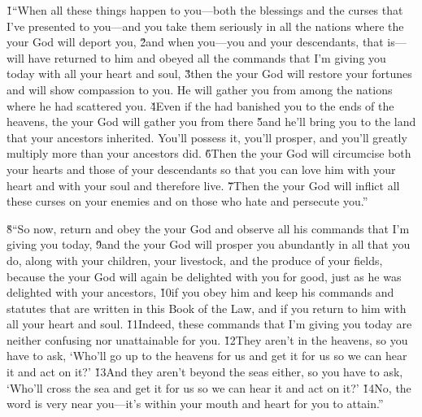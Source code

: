\v{1}``When all these things happen to you---both the blessings and the curses that I've presented to you---and you take them seriously in all the nations where the  your God will deport you, \v{2}and when you---you and your descendants, that is---will have returned to him and obeyed all the commands that I'm giving you today with all your heart and soul, \v{3}then the  your God will restore your fortunes and will show compassion to you. He will gather you from among the nations where he had scattered you. \v{4}Even if the  had banished you to the ends of the heavens, the  your God will gather you from there \v{5}and he'll bring you to the land that your ancestors inherited. You'll possess it, you'll prosper, and you'll greatly multiply more than your ancestors did. \v{6}Then the  your God will circumcise both your hearts and those of your descendants so that you can love him with your heart and with your soul and therefore live. \v{7}Then the  your God will inflict all these curses on your enemies and on those who hate and persecute you.''

\v{8}``So now, return and obey the  your God and observe all his commands that I'm giving you today, \v{9}and the  your God will prosper you abundantly in all that you do, along with your children, your livestock, and the produce of your fields, because the  your God will again be delighted with you for good, just as he was delighted with your ancestors, \v{10}if you obey him and keep his commands and statutes that are written in this Book of the Law, and if you return to him with all your heart and soul. \v{11}Indeed, these commands that I'm giving you today are neither confusing nor unattainable for you. \v{12}They aren't in the heavens, so you have to ask, `Who'll go up to the heavens for us and get it for us so we can hear it and act on it?' \v{13}And they aren't beyond the seas either, so you have to ask, `Who'll cross the sea and get it for us so we can hear it and act on it?' \v{14}No, the word is very near you---it's within your mouth and heart for you to attain.''

